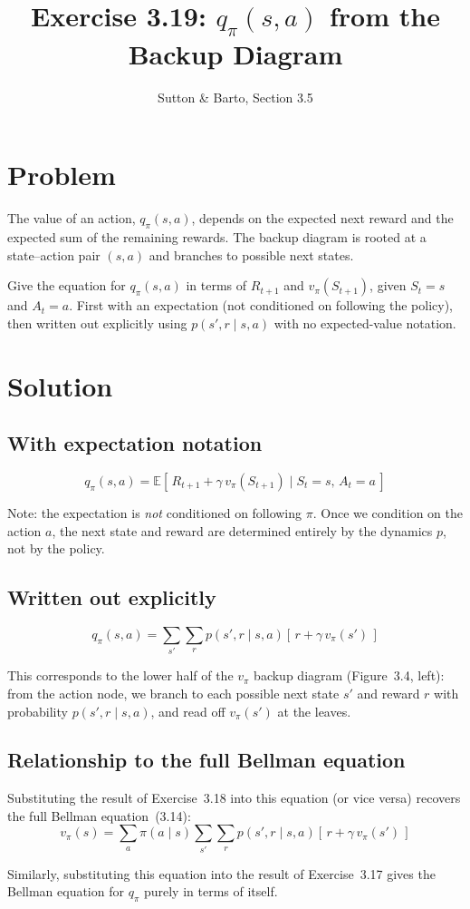 \documentclass[11pt]{article}
\title{Exercise 3.19: $q_\pi(s,a)$ from the Backup Diagram}
\author{Sutton \& Barto, Section 3.5}
\date{}
\begin{document}
\maketitle

\section*{Problem}

The value of an action, $q_\pi(s, a)$, depends on the expected next reward and
the expected sum of the remaining rewards. The backup diagram is rooted at a
state--action pair $(s, a)$ and branches to possible next states.

Give the equation for $q_\pi(s, a)$ in terms of $R_{t+1}$ and $v_\pi(S_{t+1})$,
given $S_t = s$ and $A_t = a$. First with an expectation (not conditioned on
following the policy), then written out explicitly using $p(s', r \mid s, a)$
with no expected-value notation.

\section*{Solution}

\subsection*{With expectation notation}

\[
    q_\pi(s, a) = \mathbb{E}\!\left[\, R_{t+1} + \gamma\, v_\pi(S_{t+1})
    \mid S_t = s,\, A_t = a \,\right]
\]

Note: the expectation is \emph{not} conditioned on following $\pi$. Once we
condition on the action $a$, the next state and reward are determined entirely
by the dynamics $p$, not by the policy.

\subsection*{Written out explicitly}

\[
    \boxed{q_\pi(s, a) = \sum_{s'} \sum_{r} p(s', r \mid s, a)
    \left[\, r + \gamma\, v_\pi(s') \,\right]}
\]

This corresponds to the lower half of the $v_\pi$ backup diagram (Figure~3.4,
left): from the action node, we branch to each possible next state $s'$ and
reward $r$ with probability $p(s', r \mid s, a)$, and read off $v_\pi(s')$
at the leaves.

\subsection*{Relationship to the full Bellman equation}

Substituting the result of Exercise~3.18 into this equation (or vice versa)
recovers the full Bellman equation~(3.14):
\[
    v_\pi(s) = \sum_{a} \pi(a \mid s) \sum_{s'} \sum_{r}
    p(s', r \mid s, a) \left[\, r + \gamma\, v_\pi(s') \,\right]
\]

Similarly, substituting this equation into the result of Exercise~3.17 gives
the Bellman equation for $q_\pi$ purely in terms of itself.
\end{document}

